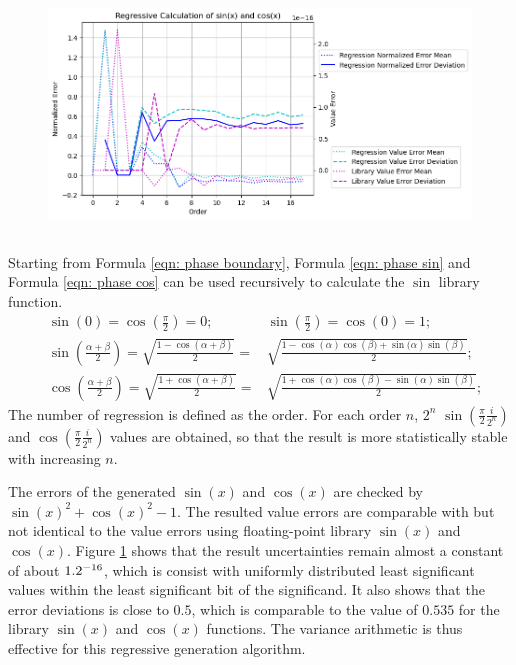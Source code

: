 \documentclass[twoside]{article}
\numberwithin{equation}{section}
\begin{document}
\begin{figure}
\centering
\includegraphics[height=2.5in]{Uncertain_Sin.png} 
\label{fig: Uncertain_Sin}
\end{figure}

Starting from Formula \eqref{eqn: phase boundary}, Formula \eqref{eqn: phase sin} and Formula \eqref{eqn: phase cos} can be used recursively to calculate the $\sin$ library function.  
\begin{align}
\label{eqn: phase boundary}
& \sin(0) = \cos(\frac{\pi}{2}) = 0; & \sin(\frac{\pi}{2}) = \cos(0) = 1; \\
\label{eqn: phase sin}
& \sin \left(\frac{\alpha + \beta}{2} \right) = \sqrt{\frac{1 - \cos \left(\alpha + \beta \right)}{2}} = & \sqrt{\frac{1 - \cos(\alpha) \cos \left(\beta) + \sin(\alpha \right) \sin(\beta)}{2}}; \\
\label{eqn: phase cos}
& \cos \left(\frac{\alpha + \beta}{2} \right) = \sqrt{\frac{1 + \cos \left(\alpha + \beta \right)}{2}} = & \sqrt{\frac{1 + \cos(\alpha) \cos(\beta) - \sin(\alpha) \sin(\beta)}{2}};
\end{align}
The number of regression is defined as the order.
For each order $n$, $2^n$ $\sin(\frac{\pi}{2} \frac{i}{2^n})$ and $\cos(\frac{\pi}{2} \frac{i}{2^n})$ values are obtained, so that the result is more statistically stable with increasing $n$.

The errors of the generated $\sin(x)$ and $\cos(x)$ are checked by $\sin(x)^2 + \cos(x)^2 - 1$.
The resulted value errors are comparable with but not identical to the value errors using floating-point library $\sin(x)$ and $\cos(x)$.
Figure \ref{fig: Uncertain_Sin} shows that the result uncertainties remain almost a constant of about $1.2 \time 10^{-16}$, which is consist with uniformly distributed least significant values within the least significant bit of the significand.
It also shows that the error deviations is close to $0.5$, which is comparable to the value of $0.535$ for the library $\sin(x)$ and $\cos(x)$ functions.
The variance arithmetic is thus effective for this regressive generation algorithm.
\end{document}
